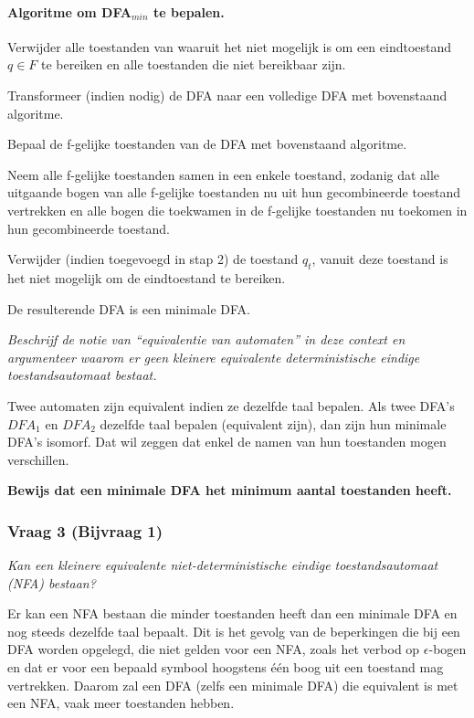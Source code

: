 \paragraph{Algoritme om DFA$_{min}$ te bepalen.}
\begin{enumalgo}
  \item Verwijder alle toestanden van waaruit het niet mogelijk is om een eindtoestand $q \in F$ te bereiken en alle toestanden die niet bereikbaar zijn.
  \item Transformeer (indien nodig) de DFA naar een volledige DFA met bovenstaand algoritme.
  \item Bepaal de f-gelijke toestanden van de DFA met bovenstaand algoritme.
  \item Neem alle f-gelijke toestanden samen in een enkele toestand, zodanig dat alle uitgaande bogen van alle f-gelijke toestanden nu uit hun gecombineerde toestand vertrekken en alle bogen die toekwamen in de f-gelijke toestanden nu toekomen in hun gecombineerde toestand.
  \item Verwijder (indien toegevoegd in stap 2) de toestand $q_t$, vanuit deze toestand is het niet mogelijk om de eindtoestand te bereiken.
  \end{enumalgo}
  De resulterende DFA is een minimale DFA.

\textit{Beschrijf de notie van ``equivalentie van automaten'' in deze context en argumenteer waarom er geen kleinere equivalente deterministische eindige toestandsautomaat bestaat.}

Twee automaten zijn equivalent indien ze dezelfde taal bepalen. Als twee DFA's $DFA_1$ en $DFA_2$ dezelfde taal bepalen (equivalent zijn), dan zijn hun minimale DFA's isomorf. Dat wil zeggen dat enkel de namen van hun toestanden mogen verschillen.

\textbf{Bewijs dat een minimale DFA het minimum aantal toestanden heeft.} 

\subsubsection{Vraag 3 (Bijvraag 1)}

\textit{Kan een kleinere equivalente niet-deterministische eindige toestandsautomaat (NFA) bestaan?}

Er kan een NFA bestaan die minder toestanden heeft dan een minimale DFA en nog steeds dezelfde taal bepaalt. Dit is het gevolg van de beperkingen die bij een DFA worden opgelegd, die niet gelden voor een NFA, zoals het verbod op $\epsilon$-bogen en dat er voor een bepaald symbool hoogstens \'e\'en boog uit een toestand mag vertrekken. Daarom zal een DFA (zelfs een minimale DFA) die equivalent is met een NFA, vaak meer toestanden hebben.

